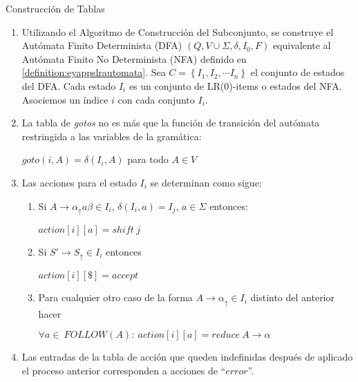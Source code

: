 \begin{algorithm} 
\label{alg:eyapptables}       
Construcción de Tablas 

\begin{enumerate}
\item
Utilizando el Algoritmo de Construcción del Subconjunto, se construye
el Autómata Finito Determinista (DFA) $(Q, V \cup \Sigma, \delta, I_0, F)$
equivalente al Autómata Finito No
Determinista (NFA) definido en \ref{definition:eyappslrautomata}.
Sea $C = \left \{ I_1, I_2, \cdots I_n \right \}$ el conjunto de estados
del DFA. Cada estado $I_i$ es un conjunto de LR(0)-items o estados
del NFA. Asociemos un índice $i$ con cada conjunto $I_i$.
\item
La tabla de \emph{gotos} no es más que la función de transición del 
autómata restringida a las variables de la gramática:

\begin{center}
$goto(i,A) = \delta(I_i, A)$ para todo $A \in V$
\end{center}
\item
Las acciones para el estado $I_i$ se determinan como sigue:
  \begin{enumerate}
  \item
  Si $A \rightarrow \alpha _\uparrow a \beta \in I_i$, $\delta(I_i,a) = I_j$, $a \in \Sigma$ 
  entonces:

\begin{center}
  $action[i][a] = shift\ j$
\end{center}
  \item
  Si $S' \rightarrow S_\uparrow \in I_i$ entonces 

\begin{center}
  $action[i][\$] = accept$
\end{center}
  \item
  Para cualquier otro caso de la forma $A \rightarrow \alpha _\uparrow \in I_i$ 
  distinto del anterior hacer

\begin{center}
  $\forall a \in\ FOLLOW(A):\ action[i][a] = reduce\ A \rightarrow \alpha$
\end{center}
  \end{enumerate}
\item
  Las entradas de la tabla de acción que queden indefinidas después de aplicado el proceso anterior corresponden a acciones de ``$error$''.
\end{enumerate}
\end{algorithm}

